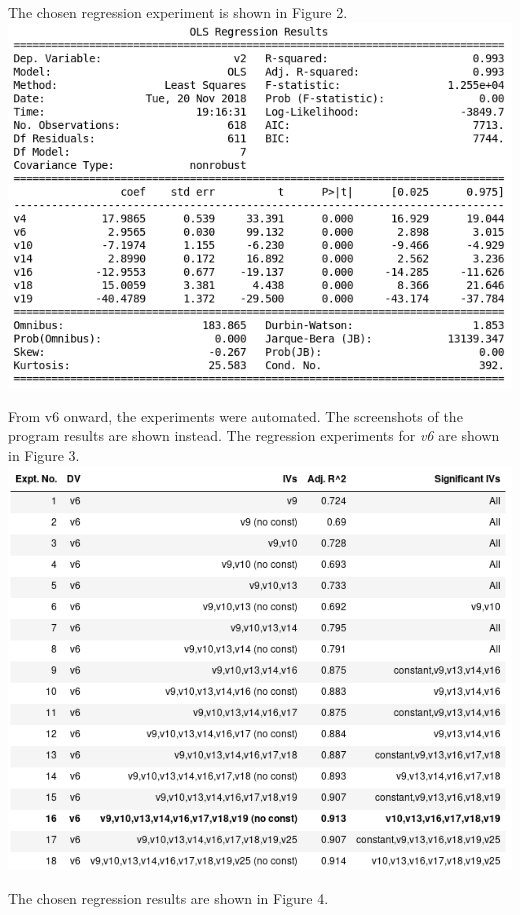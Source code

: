\documentclass[12pt,a4paper]{article}
\begin{document}
\begingroup
{}
\endgroup
\hfill\break
The chosen regression experiment is shown in Figure 2.
\includegraphics[scale=0.5]{v2_reg.png}
\begingroup
{}
\endgroup
\hfill\break

From v6 onward, the experiments were automated. The screenshots of the program results are shown instead. The regression experiments for \textit{v6} are shown in Figure 3.
\includegraphics[scale=0.5]{v6_reg.png}
\begingroup
{}
\endgroup

The chosen regression results are shown in Figure 4.\\
\end{document}

